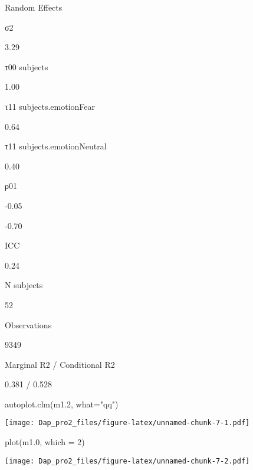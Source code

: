 \documentclass[
]{article}
\newenvironment{Shaded}{\begin{snugshade}}{\end{snugshade}}
\newcommand{\AttributeTok}[1]{\textcolor[rgb]{0.77,0.63,0.00}{#1}}
\newcommand{\DecValTok}[1]{\textcolor[rgb]{0.00,0.00,0.81}{#1}}
\newcommand{\FloatTok}[1]{\textcolor[rgb]{0.00,0.00,0.81}{#1}}
\newcommand{\FunctionTok}[1]{\textcolor[rgb]{0.00,0.00,0.00}{#1}}
\newcommand{\NormalTok}[1]{#1}
\newcommand{\StringTok}[1]{\textcolor[rgb]{0.31,0.60,0.02}{#1}}
\begin{document}
Random Effects

σ2

3.29

τ00 subjects

1.00

τ11 subjects.emotionFear

0.64

τ11 subjects.emotionNeutral

0.40

ρ01

-0.05

-0.70

ICC

0.24

N subjects

52

Observations

9349

Marginal R2 / Conditional R2

0.381 / 0.528

\begin{Shaded}
\begin{Highlighting}[]
\FunctionTok{autoplot.clm}\NormalTok{(m1}\FloatTok{.2}\NormalTok{, }\AttributeTok{what=}\StringTok{"qq"}\NormalTok{)}
\end{Highlighting}
\end{Shaded}

\texttt{[image: Dap\_pro2\_files/figure-latex/unnamed-chunk-7-1.pdf]}

\begin{Shaded}
\begin{Highlighting}[]
\FunctionTok{plot}\NormalTok{(m1}\FloatTok{.0}\NormalTok{, }\AttributeTok{which =} \DecValTok{2}\NormalTok{)}
\end{Highlighting}
\end{Shaded}

\texttt{[image: Dap\_pro2\_files/figure-latex/unnamed-chunk-7-2.pdf]}
\end{document}
